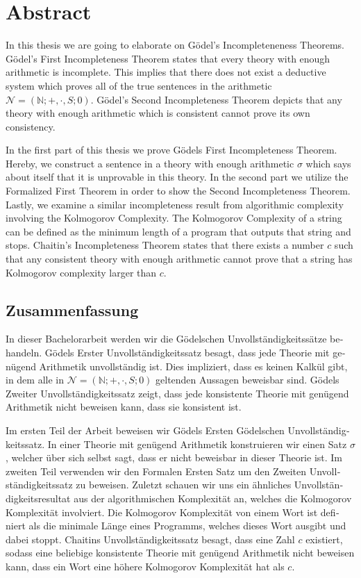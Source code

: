 \chapter*{Abstract}

In this thesis we are going to elaborate on G\"odel's Incompleteneness Theorems. G\"odel's First Incompleteness Theorem states that every theory with enough arithmetic is incomplete. This implies that there does not exist a deductive system which proves all of the true sentences in the arithmetic $\mathcal{N}=(\mathbb{N};+,\cdot, S; 0)$. G\"odel's Second Incompleteness Theorem depicts that any theory with enough arithmetic which is consistent cannot prove its own consistency.

In the first part of this thesis we prove G\"odels First Incompleteness Theorem. Hereby, we construct a sentence in a theory with enough arithmetic $\sigma$ which says about itself that it is unprovable in this theory. In the second part we utilize the Formalized First Theorem in order to show the Second Incompleteness Theorem. Lastly, we examine a similar incompleteness result from algorithmic complexity involving the Kolmogorov Complexity. The Kolmogorov Complexity of a string can be defined as the minimum length of a program that outputs that string and stops. Chaitin's Incompleteness Theorem states that there exists a number $c$ such that any consistent theory with enough arithmetic cannot prove that a string has Kolmogorov complexity larger than $c$. 

\newpage
\newpage

\begin{german}
{\let\clearpage\relax\chapter*{Zusammenfassung}}
In dieser Bachelorarbeit werden wir die G\"odelschen Unvollst\"andigkeitss\"atze behandeln. G\"odels Erster Unvollst\"andigkeitssatz besagt, dass jede Theorie mit genügend Arithmetik unvollst\"andig ist. Dies impliziert, dass es keinen Kalk\"ul gibt, in dem alle in $\mathcal{N}=(\mathbb{N};+,\cdot, S; 0)$ geltenden Aussagen beweisbar sind. G\"odels Zweiter Unvollst\"andigkeitssatz zeigt, dass jede konsistente Theorie mit genügend Arithmetik nicht beweisen kann, dass sie konsistent ist.

Im ersten Teil der Arbeit beweisen wir G\"odels Ersten G\"odelschen Unvollst\"andigkeitssatz. In einer Theorie mit gen\"ugend Arithmetik konstruieren wir einen Satz $\sigma$, welcher \"uber sich selbst sagt, dass er nicht beweisbar in dieser Theorie ist. Im zweiten Teil verwenden wir den Formalen Ersten Satz um den Zweiten Unvollst\"andigkeitssatz zu beweisen. Zuletzt schauen wir uns ein \"ahnliches Unvollst\"andigkeitsresultat aus der algorithmischen Komplexit\"at an, welches die Kolmogorov Komplexit\"at involviert. Die Kolmogorov Komplexit\"at von einem Wort ist definiert als die minimale L\"ange eines Programms, welches dieses Wort ausgibt und dabei stoppt. Chaitins Unvollst\"andigkeitssatz besagt, dass eine Zahl $c$ existiert, sodass eine beliebige konsistente Theorie mit gen\"ugend Arithmetik nicht beweisen kann, dass ein Wort eine h\"ohere Kolmogorov Komplexit\"at hat als $c$. 
\end{german}